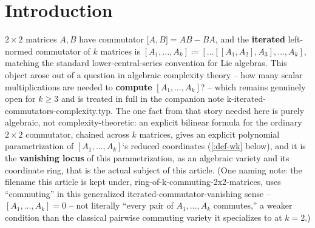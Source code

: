 \documentclass[a4paper,11pt]{scrartcl}
\begin{document}
\section{Introduction}

\(2 \times 2\) matrices \(A,B\) have commutator \(\lbrack A,B\rbrack = AB - BA\), and the \textbf{iterated} left-normed commutator of \(k\) matrices is \(\left\lbrack A_{1},\ldots,A_{k} \right\rbrack ≔ \left\lbrack \ldots\left\lbrack \left\lbrack A_{1},A_{2} \right\rbrack,A_{3} \right\rbrack,\ldots,A_{k} \right\rbrack\), matching the standard lower-central-series convention for Lie algebras. This object arose out of a question in algebraic complexity theory -- how many scalar multiplications are needed to \textbf{compute} \(\left\lbrack A_{1},\ldots,A_{k} \right\rbrack\)? -- which remains genuinely open for \(k \geq 3\) and is treated in full in the companion note k-iterated-commutators-complexity.typ. The one fact from that story needed here is purely algebraic, not complexity-theoretic: an explicit bilinear formula for the ordinary \(2 \times 2\) commutator, chained across \(k\) matrices, gives an explicit polynomial parametrization of \(\left\lbrack A_{1},\ldots,A_{k} \right\rbrack\)`s reduced coordinates (\cref{:def-wk} below), and it is the \textbf{vanishing locus} of this parametrization, as an algebraic variety and its coordinate ring, that is the actual subject of this article. (One naming note: the filename this article is kept under, ring-of-k-commuting-2x2-matrices, uses ``commuting'' in this generalized iterated-commutator-vanishing sense -- \(\left\lbrack A_{1},\ldots,A_{k} \right\rbrack = 0\) -- not literally ``every pair of \(A_{1},\ldots,A_{k}\) commutes,'' a weaker condition than the classical pairwise commuting variety it specializes to at \(k = 2\).)
\end{document}
